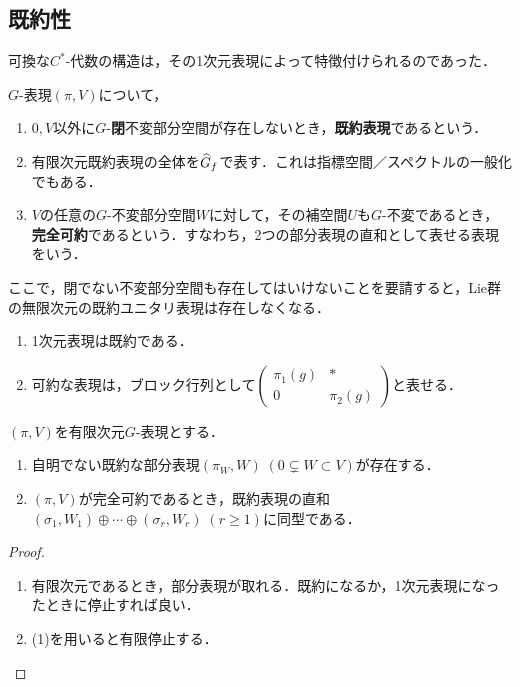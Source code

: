 \documentclass[uplatex,dvipdfmx]{jsreport}
\begin{document}
\subsection{既約性}

\begin{tcolorbox}[colframe=ForestGreen, colback=ForestGreen!10!white,breakable,colbacktitle=ForestGreen!40!white,coltitle=black,fonttitle=\bfseries\sffamily,
title=]
    可換な$C^*$-代数の構造は，その1次元表現によって特徴付けられるのであった．
\end{tcolorbox}

\begin{definition}
    $G$-表現$(\pi,V)$について，
    \begin{enumerate}
        \item $0,V$以外に$G$-\textbf{閉}不変部分空間が存在しないとき，\textbf{既約表現}であるという．
        \item 有限次元既約表現の全体を$\widehat{G}_f$で表す．これは指標空間／スペクトルの一般化でもある．
        \item $V$の任意の$G$-不変部分空間$W$に対して，その補空間$U$も$G$-不変であるとき，\textbf{完全可約}であるという．すなわち，2つの部分表現の直和として表せる表現をいう．
    \end{enumerate}
\end{definition}
\begin{remarks}
    ここで，閉でない不変部分空間も存在してはいけないことを要請すると，Lie群の無限次元の既約ユニタリ表現は存在しなくなる．
\end{remarks}

\begin{example}\mbox{}
    \begin{enumerate}
        \item 1次元表現は既約である．
        \item 可約な表現は，ブロック行列として$\begin{pmatrix}\pi_1(g)&*\\0&\pi_2(g)\end{pmatrix}$と表せる．
    \end{enumerate}
\end{example}

\begin{lemma}
    $(\pi,V)$を有限次元$G$-表現とする．
    \begin{enumerate}
        \item 自明でない既約な部分表現$(\pi_W,W)\;(0\subsetneq W\subset V)$が存在する．
        \item $(\pi,V)$が完全可約であるとき，既約表現の直和$(\sigma_1,W_1)\oplus\cdots\oplus(\sigma_r,W_r)\;(r\ge1)$に同型である．
    \end{enumerate}
\end{lemma}
\begin{proof}\mbox{}
    \begin{enumerate}
        \item 有限次元であるとき，部分表現が取れる．既約になるか，1次元表現になったときに停止すれば良い．
        \item (1)を用いると有限停止する．
    \end{enumerate}
\end{proof}
\end{document}
